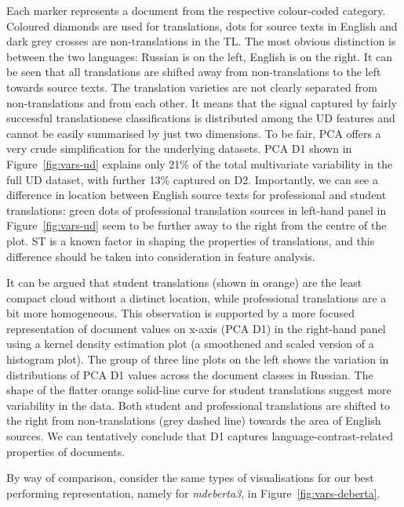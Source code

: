 Each marker represents a document from the respective colour-coded category. Coloured diamonds are used for translations, dots for source texts in English and dark grey crosses are non-translations in the TL. 
The most obvious distinction is between the two languages: Russian is on the left, English is on the right. 
It can be seen that all translations are shifted away from non-translations to the left towards source texts. 
The translation varieties are not clearly separated from non-translations and from each other. It means that the signal captured by fairly successful translationese classifications is distributed among the UD features and cannot be easily summarised by just two dimensions.
To be fair, PCA offers a very crude simplification for the underlying datasets. PCA D1 shown in Figure~\ref{fig:vars-ud} explains only 21\% of the total multivariate variability in the full UD dataset, with further 13\% captured on D2. 
Importantly, we can see a difference in location between English source texts for professional and student translations: green dots of professional translation sources in left-hand panel in Figure~\ref{fig:vars-ud} seem to be further away to the right from the centre of the plot. ST is a known factor in shaping the properties of translations, and this difference should be taken into consideration in feature analysis. 

It can be argued that student translations (shown in orange) are the least compact cloud without a distinct location, while professional translations are a bit more homogeneous. This observation is supported by a more focused representation of document values on x-axis (PCA D1) in the right-hand panel using a kernel density estimation plot (a smoothened and scaled version of a histogram plot). The group of three line plots on the left shows the variation in distributions of PCA D1 values across the document classes in Russian. The shape of the flatter orange solid-line curve for student translations suggest more variability in the data. Both student and professional translations are shifted to the right from non-translations (grey dashed line) towards the area of English sources. We can tentatively conclude that D1 captures language-contrast-related properties of documents.

By way of comparison, consider the same types of visualisations for our best performing representation, namely for \textit{mdeberta3}, in Figure~\ref{fig:vars-deberta}. 

